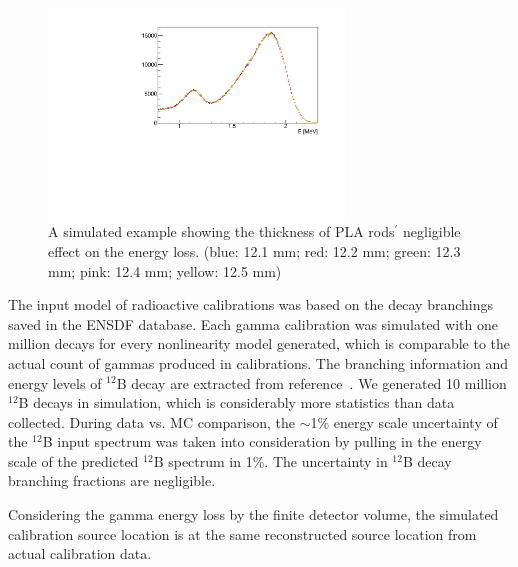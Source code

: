 \begin{figure}[h!]
\centering
\includegraphics[width=0.7\textwidth]{Figures/pinwheelthick.pdf}
\caption[The affect of PLA rod dimensions to energy scale]{A simulated example showing the thickness of PLA rods$^\prime$ negligible effect on the energy loss. (blue: 12.1 mm; red: 12.2 mm; green: 12.3 mm; pink: 12.4 mm; yellow: 12.5 mm)}
\label{fig:pinwheelthick}
\end{figure}

The input model of radioactive calibrations was based on the decay branchings saved in the ENSDF database.
Each gamma calibration was simulated with one million decays for every nonlinearity model generated, which is comparable to the actual count of gammas produced in calibrations.
The branching information and energy levels of $^{12}$B decay are extracted from reference~\cite{bib:duke}. 
We generated 10 million $^{12}$B decays in simulation, which is considerably more statistics than data collected.
During data vs. MC comparison, the $\sim$1\% energy scale uncertainty of the $^{12}$B input spectrum was taken into consideration by pulling in the energy scale of the predicted $^{12}$B spectrum in 1\%. 
The uncertainty in $^{12}$B decay branching fractions are negligible.

Considering the gamma energy loss by the finite detector volume, the simulated calibration source location is at the same reconstructed source location from actual calibration data.

\label{sec:dataMC}

